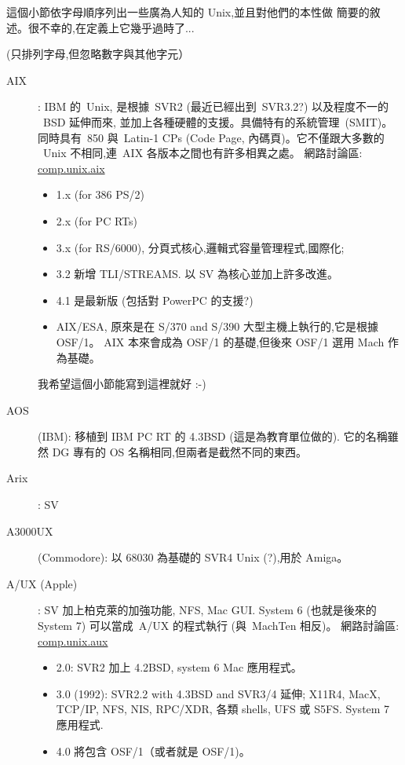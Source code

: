 \documentclass{article}
\begin{document}
\begin{CJK*}{Bg5}{ming}
      這個小節依字母順序列出一些廣為人知的 Unix,並且對他們的本性做
      簡要的敘述。很不幸的,在定義上它幾乎過時了...

      (只排列字母,但忽略數字與其他字元）
\begin{description}
      \item [AIX]: IBM 的~Unix, 是根據~SVR2 (最近已經出到~SVR3.2?) 以及程度不一的
        ~BSD 延伸而來, 並加上各種硬體的支援。具備特有的系統管理~(SMIT)。
         同時具有~850 與~Latin-1 CPs (Code Page, 內碼頁)。它不僅跟大多數的
        ~Unix 不相同,連~AIX 各版本之間也有許多相異之處。
         網路討論區: \url{comp.unix.aix}
	\begin{itemize}
         \item 1.x (for 386 PS/2)
         \item 2.x (for PC RTs)
         \item 3.x (for RS/6000), 分頁式核心,邏輯式容量管理程式,國際化;
         \item 3.2 新增 TLI/STREAMS.  以 SV 為核心並加上許多改進。
         \item 4.1 是最新版 (包括對 PowerPC 的支援?)
         \item AIX/ESA, 原來是在 S/370 and S/390 大型主機上執行的,它是根據 OSF/1。
           AIX 本來會成為 OSF/1 的基礎,但後來 OSF/1 選用 Mach 作為基礎。
	\end{itemize}
         我希望這個小節能寫到這裡就好 :-)

      \item [AOS] (IBM):  移植到 IBM PC RT 的 4.3BSD (這是為教育單位做的).
      它的名稱雖然 DG 專有的 OS 名稱相同,但兩者是截然不同的東西。

      \item [Arix]:  SV

      \item [A3000UX](Commodore): 以 68030 為基礎的 SVR4 Unix (?),用於 Amiga。

      \item [A/UX (Apple)]: SV 加上柏克萊的加強功能, NFS, Mac GUI.  System 6
         (也就是後來的 System 7) 可以當成~A/UX 的程式執行 (與~MachTen 相反)。
         網路討論區: \url{comp.unix.aux}
	\begin{itemize}
         \item 2.0:  SVR2 加上 4.2BSD, system 6 Mac 應用程式。
         \item 3.0 (1992): SVR2.2 with 4.3BSD and SVR3/4 延伸; X11R4,
           MacX, TCP/IP, NFS, NIS, RPC/XDR, 各類 shells, UFS 或 S5FS.
           System 7 應用程式.
         \item 4.0 將包含 OSF/1（或者就是 OSF/1)。
	\end{itemize}


\end{description}
\end{CJK*}
\end{document}
